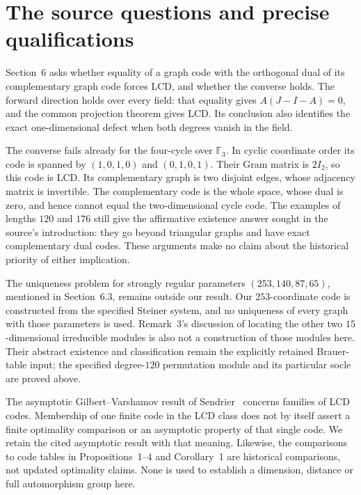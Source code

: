 \section{The source questions and precise qualifications}

Section~6 asks whether equality of a graph code with the orthogonal dual
of its complementary graph code forces LCD, and whether the converse
holds. The forward direction holds over every field: that equality gives
$A(J-I-A)=0$, and the common projection theorem
\cite[Theorem~1.2]{U} gives LCD. Its conclusion also identifies the exact
one-dimensional defect when both degrees vanish in the field.

The converse fails already for the four-cycle over $\mathbb F_3$.
In cyclic coordinate order its code is spanned by
$(1,0,1,0)$ and $(0,1,0,1)$. Their Gram matrix is $2I_2$, so this code is
LCD. Its complementary graph is two disjoint edges, whose adjacency
matrix is invertible. The complementary code is the whole space, whose
dual is zero, and hence cannot equal the two-dimensional cycle code.
The examples of lengths $120$ and $176$ still give the affirmative
existence answer sought in the source's introduction: they go beyond
triangular graphs and have exact complementary dual codes. These
arguments make no claim about the historical priority of either implication.

The uniqueness problem for strongly regular parameters $(253,140,87,65)$,
mentioned in Section~6.3, remains outside our result. Our $253$-coordinate
code is constructed from the specified Steiner system, and no uniqueness
of every graph with those parameters is used. Remark~3's discussion of
locating the other two $15$-dimensional irreducible modules is also not a
construction of those modules here. Their abstract existence and
classification remain the explicitly retained Brauer-table input; the
specified degree-$120$ permutation module and its particular socle are
proved above.

The asymptotic Gilbert--Varshamov result of Sendrier~\cite{Sendrier}
concerns families of LCD codes. Membership of one finite code in the LCD
class does not by itself assert a finite optimality comparison or an
asymptotic property of that single code. We retain the cited asymptotic
result with that meaning. Likewise, the comparisons to code tables in
Propositions~1--4 and Corollary~1 are historical comparisons, not updated
optimality claims. None is used to establish a dimension, distance or
full automorphism group here.

